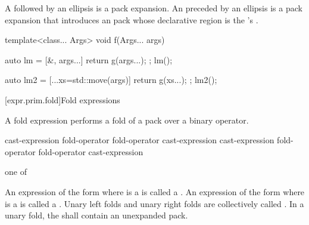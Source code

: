 \pnum
A  followed by an ellipsis is a pack
expansion.
%
An  preceded by an ellipsis is a pack
expansion that introduces an
 pack
whose declarative region is
the 's .
\begin{example}
\begin{codeblock}
template<class... Args>
void f(Args... args) {
  auto lm = [&, args...] { return g(args...); };
  lm();

  auto lm2 = [...xs=std::move(args)] { return g(xs...); };
  lm2();
}
\end{codeblock}
\end{example}

[expr.prim.fold]{Fold expressions}%

\pnum
A fold expression performs a fold of a
pack over a binary operator.

\begin{bnf}
\br
    \terminal{(} cast-expression fold-operator  \terminal{)}\br
    \terminal{(}  fold-operator cast-expression \terminal{)}\br
    \terminal{(} cast-expression fold-operator  fold-operator cast-expression \terminal{)}
\end{bnf}

\begin{bnf}
 \textnormal{one of}\br
    \terminal{+ }\quad\terminal{- }\quad\terminal{* }\quad\terminal{/ }\quad\terminal{\% }\quad\terminal{\caret{} }\quad\terminal{\& }\quad\terminal{| }\quad\terminal{<< }\quad\terminal{>> }\br
    \terminal{+=}\quad\terminal{-=}\quad\terminal{*=}\quad\terminal{/=}\quad\terminal{\%=}\quad\terminal{\caret=}\quad\terminal{\&=}\quad\terminal{|=}\quad\terminal{<<=}\quad\terminal{>>=}\quad\terminal{=}\br
    \terminal{==}\quad\terminal{!=}\quad\terminal{< }\quad\terminal{> }\quad\terminal{<=}\quad\terminal{>=}\quad\terminal{\&\&}\quad\terminal{||}\quad\terminal{,  }\quad{}\quad\terminal{->*}
\end{bnf}

\pnum
{}%
An expression of the form
  
where  is a 
is called a .
An expression of the form
  
where  is a 
is called a .
Unary left folds and unary right folds
are collectively called .
In a unary fold,
the 
shall contain an unexpanded pack.

